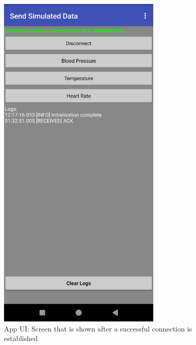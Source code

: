 \newpage
\begin{figure}[H]
	\centering
	\includegraphics[width=0.7\textwidth]{images/app_ui_main_connected}
	\caption{App UI: Screen that is shown after a successful connection is established}
	\label{appendix:app_ui_connected}
\end{figure}

